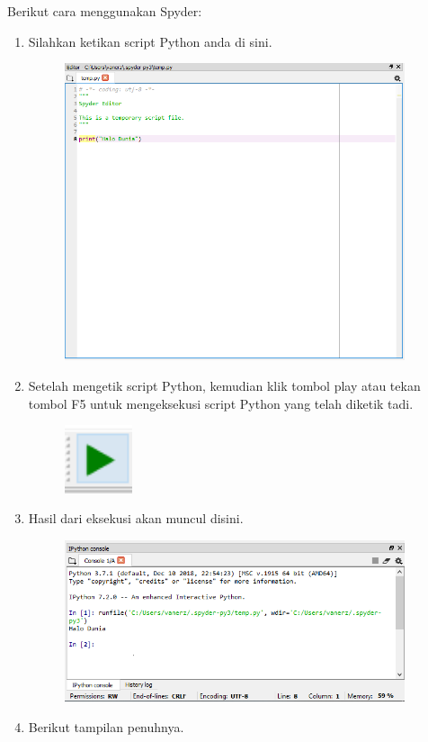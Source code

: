 Berikut cara menggunakan Spyder:
\begin{enumerate}
	\item Silahkan ketikan script Python anda di sini.
	\begin{figure}[H]
		\includegraphics[width=10cm]{figures/diva/20chp1diva.png}
		\centering
	\end{figure}
	\item Setelah mengetik script Python, kemudian klik tombol play atau tekan tombol F5 untuk mengeksekusi script Python yang telah diketik tadi.
	\begin{figure}[H]
		\includegraphics[width=2cm]{figures/diva/22chp1diva.png}
		\centering
	\end{figure}
	\item Hasil dari eksekusi akan muncul disini.
	\begin{figure}[H]
		\includegraphics[width=10cm]{figures/diva/21chp1diva.png}
		\centering
	\end{figure}
		\item Berikut tampilan penuhnya.

\end{enumerate}
